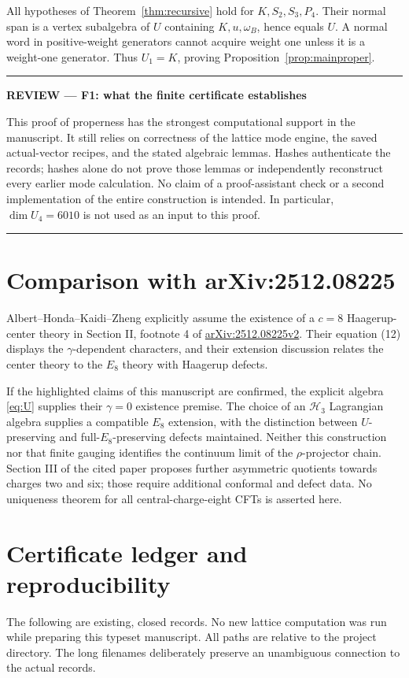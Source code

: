 \documentclass[11pt,a4paper]{article}
\theoremstyle{definition}
\newcommand{\HH}{\mathcal H}
\newenvironment{reviewnote}[1]{\par\addvspace{8pt}\begingroup
  \color{Sepia}\noindent\rule{\linewidth}{0.7pt}\par\nobreak
  \noindent\textbf{REVIEW --- #1}\par\nobreak\small\noindent\ignorespaces
}{\par\noindent\rule{\linewidth}{0.7pt}\par\endgroup\addvspace{8pt}}
\begin{document}
All hypotheses of Theorem~\ref{thm:recursive} hold for
\(K,S_2,S_3,P_4\). Their normal span is a vertex subalgebra of \(U\)
containing \(K,u,\omega_B\), hence equals \(U\). A normal word in
positive-weight generators cannot acquire weight one unless it is a
weight-one generator. Thus \(U_1=K\), proving
Proposition~\ref{prop:mainproper}.

\begin{reviewnote}{F1: what the finite certificate establishes}
This proof of properness has the strongest computational support in the
manuscript. It still relies on correctness of the lattice mode engine,
the saved actual-vector recipes, and the stated algebraic lemmas.
Hashes authenticate the records; hashes alone do not prove those lemmas
or independently reconstruct every earlier mode calculation. No claim
of a proof-assistant check or a second implementation of the entire
construction is intended. In particular, \(\dim U_4=6010\) is not used
as an input to this proof.
\end{reviewnote}




\section{Comparison with arXiv:2512.08225}\label{sec:comparison}
Albert--Honda--Kaidi--Zheng explicitly assume the existence of a
\(c=8\) Haagerup-center theory in Section II, footnote 4 of
\href{https://arxiv.org/html/2512.08225v2#S2}{arXiv:2512.08225v2}.
Their equation (12) displays the \(\gamma\)-dependent characters,
and their extension discussion relates the center theory to the
\(E_8\) theory with Haagerup defects.

If the highlighted claims of this manuscript are confirmed, the explicit
algebra \eqref{eq:U} supplies their \(\gamma=0\) existence premise.
The choice of an \(\HH_3\) Lagrangian algebra supplies a compatible
\(E_8\) extension, with the distinction between \(U\)-preserving and
full-\(E_8\)-preserving defects maintained. Neither this construction
nor that finite gauging identifies the continuum limit of the
\(\rho\)-projector chain. Section III of the cited paper proposes
further asymmetric quotients towards charges two and six; those require
additional conformal and defect data. No uniqueness theorem for all
central-charge-eight CFTs is asserted here.

\appendix
\section{Certificate ledger and reproducibility}\label{sec:ledger}
The following are existing, closed records. No new lattice computation
was run while preparing this typeset manuscript. All paths are relative
to the project directory. The long filenames deliberately preserve an
unambiguous connection to the actual records.
\end{document}
